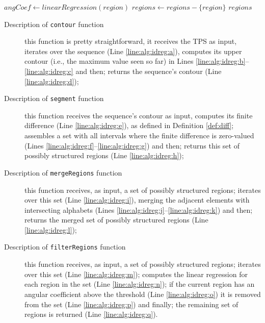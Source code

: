 \documentclass{vldb}
\begin{document}
\begin{algorithm}
\begin{algorithmic}[1]

 
\label{line:alg:idreg:m}
\State $angCoef \leftarrow linearRegression(region)$\label{line:alg:idreg:n}
\label{line:alg:idreg:o}
\State $regions \leftarrow regions - \{region\}$\label{line:alg:idreg:p}
\EndIf
\EndFor
\State \Return $regions$\label{line:alg:idreg:q}
\EndFunction

\end{algorithmic}
\end{algorithm}

\begin{description}
\item[Description of \texttt{contour} function] this function is
pretty straightforward, it receives the TPS as input, iterates over the sequence (Line
\ref{line:alg:idreg:a}), computes its upper contour (i.e., the maximum value
seen so far) in Lines \ref{line:alg:idreg:b}--\ref{line:alg:idreg:c} and then;
returns the sequence's contour (Line \ref{line:alg:idreg:d});
\item[Description of \texttt{segment} function] this function receives the
sequence's contour as input, computes its finite difference (Line
\ref{line:alg:idreg:e}), as defined in Definition \ref{def:diff};
assembles a set with all intervals where the finite difference is zero-valued
(Lines \ref{line:alg:idreg:f}--\ref{line:alg:idreg:g}) and then; returns this
set of possibly structured regions (Line \ref{line:alg:idreg:h});
\item[Description of \texttt{mergeRegions} function] this function receives, as
input, a set of possibly structured regions; iterates over this set (Line
\ref{line:alg:idreg:i}), merging the adjacent elements with intersecting alphabets (Lines
\ref{line:alg:idreg:j}--\ref{line:alg:idreg:k}) and then; returns the merged set
of possibly structured regions (Line \ref{line:alg:idreg:l});
\item[Description of \texttt{filterRegions} function] this function receives, as
input, a set of possibly structured regions; iterates over this set (Line
\ref{line:alg:idreg:m}); computes the linear regression for each region in the
set (Line \ref{line:alg:idreg:n}); if the current region has an angular
coefficient above the threshold (Line \ref{line:alg:idreg:o}) it is removed from the set
(Line \ref{line:alg:idreg:p}) and finally; the remaining set of regions is
returned (Line \ref{line:alg:idreg:q}).
\end{description}
\end{document}
